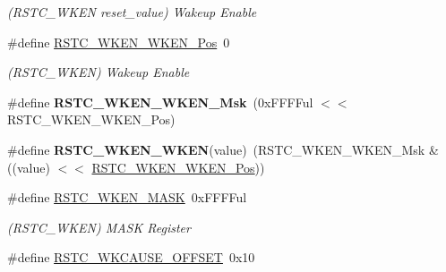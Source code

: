 \begin{DoxyCompactItemize}
\begin{DoxyCompactList}\small\item\em (R\+S\+T\+C\+\_\+\+W\+K\+E\+N reset\+\_\+value) Wakeup Enable \end{DoxyCompactList}\item 
\hypertarget{group___s_a_m_l21___r_s_t_c_gacbf8db18ad173c50922fcb29f96aec63}{}\#define \hyperlink{group___s_a_m_l21___r_s_t_c_gacbf8db18ad173c50922fcb29f96aec63}{R\+S\+T\+C\+\_\+\+W\+K\+E\+N\+\_\+\+W\+K\+E\+N\+\_\+\+Pos}~0\label{group___s_a_m_l21___r_s_t_c_gacbf8db18ad173c50922fcb29f96aec63}

\begin{DoxyCompactList}\small\item\em (R\+S\+T\+C\+\_\+\+W\+K\+E\+N) Wakeup Enable \end{DoxyCompactList}\item 
\hypertarget{group___s_a_m_l21___r_s_t_c_gab3259bd87f879a87d54595241792242f}{}\#define {\bfseries R\+S\+T\+C\+\_\+\+W\+K\+E\+N\+\_\+\+W\+K\+E\+N\+\_\+\+Msk}~(0x\+F\+F\+F\+Ful $<$$<$ R\+S\+T\+C\+\_\+\+W\+K\+E\+N\+\_\+\+W\+K\+E\+N\+\_\+\+Pos)\label{group___s_a_m_l21___r_s_t_c_gab3259bd87f879a87d54595241792242f}

\item 
\hypertarget{group___s_a_m_l21___r_s_t_c_ga638780d8f89cae3079b68f43057b8fe4}{}\#define {\bfseries R\+S\+T\+C\+\_\+\+W\+K\+E\+N\+\_\+\+W\+K\+E\+N}(value)~(R\+S\+T\+C\+\_\+\+W\+K\+E\+N\+\_\+\+W\+K\+E\+N\+\_\+\+Msk \& ((value) $<$$<$ \hyperlink{group___s_a_m_l21___r_s_t_c_gacbf8db18ad173c50922fcb29f96aec63}{R\+S\+T\+C\+\_\+\+W\+K\+E\+N\+\_\+\+W\+K\+E\+N\+\_\+\+Pos}))\label{group___s_a_m_l21___r_s_t_c_ga638780d8f89cae3079b68f43057b8fe4}

\item 
\hypertarget{group___s_a_m_l21___r_s_t_c_ga68c51e27f48ec8b960a98b0c6c9936d0}{}\#define \hyperlink{group___s_a_m_l21___r_s_t_c_ga68c51e27f48ec8b960a98b0c6c9936d0}{R\+S\+T\+C\+\_\+\+W\+K\+E\+N\+\_\+\+M\+A\+S\+K}~0x\+F\+F\+F\+Ful\label{group___s_a_m_l21___r_s_t_c_ga68c51e27f48ec8b960a98b0c6c9936d0}

\begin{DoxyCompactList}\small\item\em (R\+S\+T\+C\+\_\+\+W\+K\+E\+N) M\+A\+S\+K Register \end{DoxyCompactList}\item 
\hypertarget{group___s_a_m_l21___r_s_t_c_gaf9426f8e26d6073620cfd1ec226c399a}{}\#define \hyperlink{group___s_a_m_l21___r_s_t_c_gaf9426f8e26d6073620cfd1ec226c399a}{R\+S\+T\+C\+\_\+\+W\+K\+C\+A\+U\+S\+E\+\_\+\+O\+F\+F\+S\+E\+T}~0x10\label{group___s_a_m_l21___r_s_t_c_gaf9426f8e26d6073620cfd1ec226c399a}


\end{DoxyCompactItemize}
